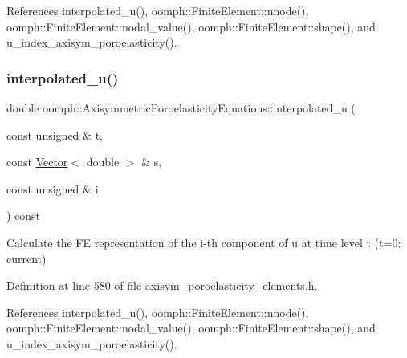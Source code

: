 References interpolated\+\_\+u(), oomph\+::\+Finite\+Element\+::nnode(), oomph\+::\+Finite\+Element\+::nodal\+\_\+value(), oomph\+::\+Finite\+Element\+::shape(), and u\+\_\+index\+\_\+axisym\+\_\+poroelasticity().

\mbox{\label{classoomph_1_1AxisymmetricPoroelasticityEquations_ad5cf568a9cd222e58cfee4968da60df8}} 
\subsubsection{\texorpdfstring{interpolated\+\_\+u()}{interpolated\_u()}\hspace{0.1cm}{\footnotesize\ttfamily [3/3]}}
{\footnotesize\ttfamily double oomph\+::\+Axisymmetric\+Poroelasticity\+Equations\+::interpolated\+\_\+u (\begin{DoxyParamCaption}\item[{const unsigned \&}]{t,  }\item[{const \hyperlink{classoomph_1_1Vector}{Vector}$<$ double $>$ \&}]{s,  }\item[{const unsigned \&}]{i }\end{DoxyParamCaption}) const\hspace{0.3cm}{\ttfamily [inline]}}



Calculate the FE representation of the i-\/th component of u at time level t (t=0\+: current) 



Definition at line 580 of file axisym\+\_\+poroelasticity\+\_\+elements.\+h.



References interpolated\+\_\+u(), oomph\+::\+Finite\+Element\+::nnode(), oomph\+::\+Finite\+Element\+::nodal\+\_\+value(), oomph\+::\+Finite\+Element\+::shape(), and u\+\_\+index\+\_\+axisym\+\_\+poroelasticity().

\mbox{\label{classoomph_1_1AxisymmetricPoroelasticityEquations_a9f1697a47ba5a34054b5820f2766f8f7}} 
